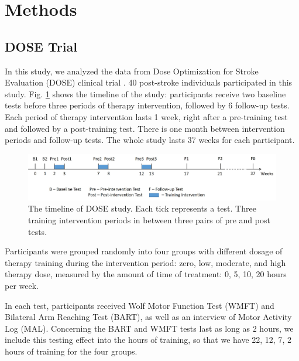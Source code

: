 \section{Methods}
\subsection{DOSE Trial}
In this study, we analyzed the data from Dose Optimization for Stroke Evaluation (DOSE) clinical trial \cite{}. 
40 post-stroke individuals participated in this study. 
Fig. \ref{fig:dosetimeline} shows the timeline of the study: participants receive two baseline tests before three periods of therapy intervention, followed by 6 follow-up tests. 
Each period of therapy intervention lasts 1 week, right after a pre-training test and followed by a post-training test. 
There is one month between intervention periods and follow-up tests. 
The whole study lasts 37 weeks for each participant.

\begin{figure}
	\centering
	\includegraphics[width=1\linewidth]{figures/dosetimeline}
	\caption[DOSE Study Timeline]{The timeline of DOSE study. Each tick represents a test. Three training intervention periods in between three pairs of pre and post tests.}
	\label{fig:dosetimeline}
\end{figure}

Participants were grouped randomly into four groups with different dosage of therapy training during the intervention period: zero, low, moderate, and high therapy dose, measured by the amount of time of treatment: 0, 5, 10, 20 hours per week.

In each test, participants received Wolf Motor Function Test (WMFT) and Bilateral Arm Reaching Test (BART), as well as an interview of Motor Activity Log (MAL). 
Concerning the BART and WMFT tests last as long as 2 hours, we include this testing effect into the hours of training, so that we have 22, 12, 7, 2 hours of training for the four groups.

